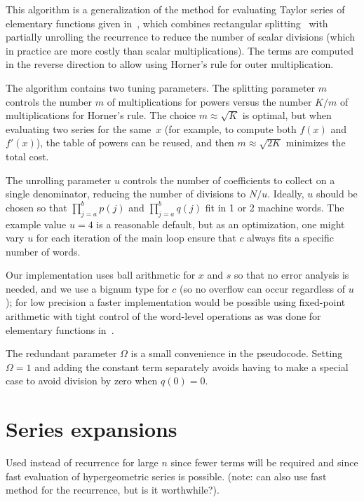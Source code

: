 \documentclass[11pt,a4paper]{article}
\begin{document}
This algorithm is a generalization of the
method for evaluating Taylor series of elementary
functions given in~\cite{Johansson2015elementary},
which combines rectangular splitting~\cite{Smith1989}
with partially unrolling the recurrence to reduce the number of scalar divisions
(which in practice are more costly than scalar multiplications).
The terms are computed in the reverse direction to allow
using Horner's rule for outer
multiplication.

The algorithm contains two tuning parameters.
The splitting parameter $m$ controls the
number $m$ of multiplications for powers versus the number $K / m$ of
multiplications for Horner's rule.
The choice $m \approx \sqrt K$ is optimal,
but when evaluating two series for the same~$x$
(for example, to compute both $f(x)$ and $f'(x)$), the table of powers can be reused,
and then $m \approx \sqrt{2K}$ minimizes the total cost.

The unrolling parameter $u$ controls the number of coefficients
to collect on a single denominator, reducing the
number of divisions to $N / u$.
Ideally, $u$ should be chosen
so that $\prod_{j=a}^b p(j)$
and $\prod_{j=a}^b q(j)$ fit in 1 or 2 machine words.
The example value $u = 4$ is a reasonable
default, but as an optimization, one might vary $u$
for each iteration of the main loop
ensure that $c$ always fits a specific number of words.

Our implementation uses ball arithmetic for $x$ and $s$
so that no error analysis is needed, and we use a bignum type for $c$ (so
no overflow can occur regardless of $u$);
for low precision a faster implementation
would be possible using fixed-point arithmetic with tight
control of the word-level operations
as was done for elementary functions in~\cite{Johansson2015elementary}.

The redundant parameter $\Omega$ is a small convenience in the pseudocode.
Setting $\Omega = 1$ and adding the constant term separately
avoids having to make a special case to avoid division by zero when $q(0) = 0$.


\section{Series expansions}

\label{sec:series}

Used instead of recurrence for large $n$ since fewer terms will
be required and since fast evaluation of hypergeometric series
is possible.
(note: can also use fast method for the
recurrence, but is it worthwhile?).
\end{document}
